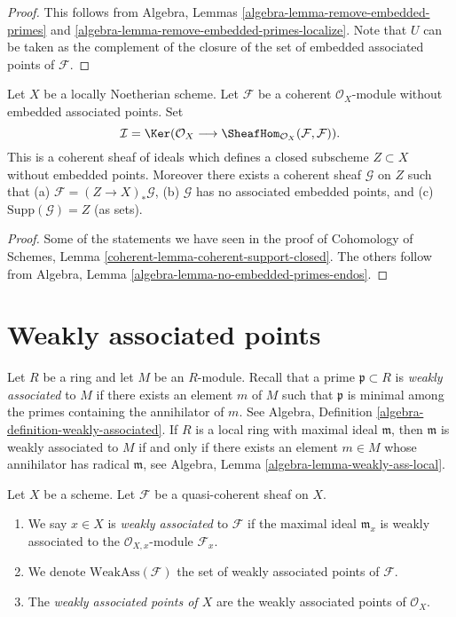 \begin{proof}
This follows from
Algebra, Lemmas \ref{algebra-lemma-remove-embedded-primes} and
\ref{algebra-lemma-remove-embedded-primes-localize}.
Note that $U$ can be taken as the complement of the closure
of the set of embedded associated points of $\mathcal{F}$.
\end{proof}

\begin{lemma}
\label{lemma-no-embedded-points-endos}
Let $X$ be a locally Noetherian scheme.
Let $\mathcal{F}$ be a coherent $\mathcal{O}_X$-module
without embedded associated points. Set
$$
\mathcal{I}
=
\Ker(\mathcal{O}_X
\longrightarrow
\SheafHom_{\mathcal{O}_X}(\mathcal{F}, \mathcal{F})).
$$
This is a coherent sheaf of ideals which defines a closed
subscheme $Z \subset X$ without embedded points. Moreover
there exists a coherent sheaf $\mathcal{G}$ on $Z$
such that (a) $\mathcal{F} = (Z \to X)_*\mathcal{G}$,
(b) $\mathcal{G}$ has no associated embedded points, and
(c) $\text{Supp}(\mathcal{G}) = Z$ (as sets).
\end{lemma}

\begin{proof}
Some of the statements we have seen in the proof of
Cohomology of Schemes, Lemma \ref{coherent-lemma-coherent-support-closed}.
The others follow from
Algebra, Lemma \ref{algebra-lemma-no-embedded-primes-endos}.
\end{proof}



\section{Weakly associated points}
\label{section-weakly-associated}

\noindent
Let $R$ be a ring and let $M$ be an $R$-module.
Recall that a prime $\mathfrak p \subset R$ is {\it weakly associated}
to $M$ if there exists an element $m$ of $M$ such that $\mathfrak p$ is
minimal among the primes containing the annihilator of $m$. See
Algebra, Definition \ref{algebra-definition-weakly-associated}.
If $R$ is a local ring with maximal ideal $\mathfrak m$, then
$\mathfrak m$ is weakly associated to $M$ if and only if there exists an
element $m \in M$ whose annihilator has radical $\mathfrak m$, see
Algebra, Lemma \ref{algebra-lemma-weakly-ass-local}.

\begin{definition}
\label{definition-weakly-associated}
Let $X$ be a scheme.
Let $\mathcal{F}$ be a quasi-coherent sheaf on $X$.
\begin{enumerate}
\item We say $x \in X$ is {\it weakly associated} to $\mathcal{F}$
if the maximal ideal $\mathfrak m_x$ is weakly associated to the
$\mathcal{O}_{X, x}$-module $\mathcal{F}_x$.
\item We denote $\text{WeakAss}(\mathcal{F})$ the set of weakly associated
points of $\mathcal{F}$.
\item The {\it weakly associated points of $X$} are the weakly associated
points of $\mathcal{O}_X$.
\end{enumerate}
\end{definition}


